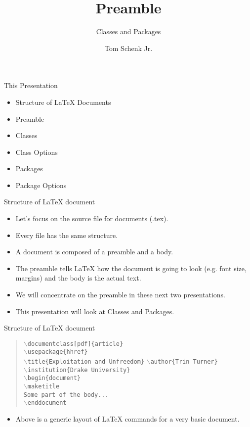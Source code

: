 \documentclass[pdf]{prosper}
\title{Preamble}
\subtitle{Classes and Packages}
\author{Tom Schenk Jr.}		%
\begin{document}
\maketitle
\begin{slide}{This Presentation}
	\begin{itemize} 
		\item Structure of \LaTeX\mbox{} Documents
		\item Preamble
		\item Classes
		\item Class Options
		\item Packages
		\item Package Options
	\end{itemize}
\end{slide}
\begin{slide}{Structure of \LaTeX\mbox{} document}
	\begin{itemize}
		\item Let's focus on the source file for documents (.tex).
		\item Every file has the same structure.
		\item A document is composed of a preamble and a body.
		\item The preamble tells \LaTeX\mbox{} how the document is going to look (e.g. font size, margins) and the body is the actual text.
		\item We will concentrate on the preamble in these next two presentations.
		\item This presentation will look at Classes and Packages.
	\end{itemize}
\end{slide}
\begin{slide}{Structure of \LaTeX\mbox{} document}
	\begin{quote}
		\texttt{$\backslash$documentclass[pdf]\{article\}} \\
		\texttt{$\backslash$usepackage\{hhref\}} \\
		\texttt{$\backslash$title\{Exploitation and Unfreedom\}}
		\texttt{$\backslash$author\{Trin Turner\}} \\
		\texttt{$\backslash$institution\{Drake University\}} \\
		\texttt{$\backslash$begin\{document\}} \\
		\texttt{$\backslash$maketitle} \\
		\texttt{Some part of the body...} \\
		\texttt{$\backslash$end{document}} \\
	\end{quote}
	\begin{itemize}
		\item Above is a generic layout of \LaTeX\mbox{} commands for a very basic document.
	\end{itemize}
\end{slide}
\end{document}
